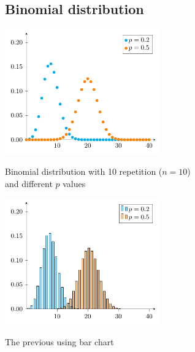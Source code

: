 \documentclass[a4paper]{article}
\begin{document}
	\subsection{Binomial distribution}
		\begin{multicols}{2}
		\centering
		\includegraphics[width=0.5\textwidth]{binomial-distribution}		
		
		Binomial distribution with 10 repetition ($n=10$)\\ and different $p$ values
		\columnbreak
				
		\includegraphics[width=0.5\textwidth]{binomial-distribution-histogram}		
				
		The previous using bar chart
		\end{multicols}
	
	\clearpage
\end{document}

